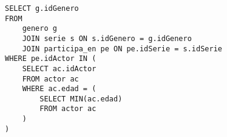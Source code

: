 \newpage
\subsubsection{}
\begin{verbatim}
SELECT g.idGenero
FROM
	genero g
	JOIN serie s ON s.idGenero = g.idGenero
	JOIN participa_en pe ON pe.idSerie = s.idSerie
WHERE pe.idActor IN (
	SELECT ac.idActor
	FROM actor ac
	WHERE ac.edad = (
		SELECT MIN(ac.edad)
		FROM actor ac
	)
)
\end{verbatim}

\subsection{}
\subsection{}
\subsection{}
\subsection{}


